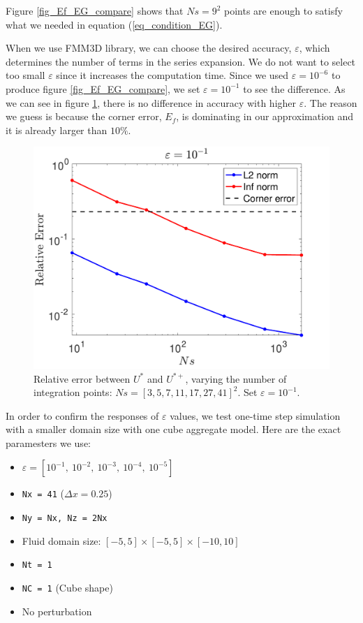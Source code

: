 Figure \ref{fig_Ef_EG_compare} shows that $Ns = 9^2$ points are enough to satisfy what we needed in equation (\ref{eq_condition_EG}). 
\par
When we use FMM3D library, we can choose the desired accuracy, $\varepsilon$, which determines the number of terms in the series expansion. We do not want to select too small $\varepsilon$ since it increases the computation time. Since we used $\varepsilon = 10^{-6}$ to produce figure \ref{fig_Ef_EG_compare}, we set $\varepsilon = 10^{-1}$ to see the difference. As we can see in figure \ref{fig_Ef_Eg_ep-1}, there is no difference in accuracy with higher $\varepsilon$. The reason we guess is because the corner error, $E_f$, is dominating in our approximation and it is already larger than $10 \%$. 
\begin{figure}[ht]
	\begin{center}
		\includegraphics[scale=0.33]{./figures/fig_Ef_Eg_ep-1}
	\caption{Relative error between $U^*$ and $U^{*+}$, varying the number of integration points: $Ns = [3, 5, 7, 11, 17, 27,41]^2$. Set $\varepsilon = 10^{-1}$.}
	\label{fig_Ef_Eg_ep-1}
\end{center}
\end{figure}
In order to confirm the responses of $\varepsilon$ values, we test one-time step simulation with a smaller domain size with one cube aggregate model. Here are the exact paramesters we use:
\begin{framed}
	\begin{itemize}
		\item $\varepsilon = [10^{-1}, \ 10^{-2}, \ 10^{-3}, \ 10^{-4}, \ 10^{-5}]$
		\item \verb+Nx = 41+ ($\Delta x = 0.25$)
		\item \verb+Ny = Nx, Nz = 2Nx+ 
		\item Fluid domain size: $[-5, 5] \times [-5, 5] \times [-10, 10]$
		\item \verb+Nt = 1+
		\item \verb+NC = 1+ (Cube shape)
		\item No perturbation
	\end{itemize}
\end{framed}
